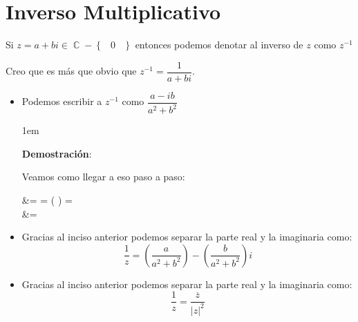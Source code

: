 \documentclass[12pt, fleqn]{report}                             %
\newenvironment{SmallIndentation}[1][0.75em]                    %
    {\begin{adjustwidth}{#1}{}\begin{footnotesize}}                 %
    {\end{footnotesize}\end{adjustwidth}}                           %
\DeclareMathOperator \Space {\quad}                             %
\DeclareMathOperator \MiniSpace {\;}                            %
\newcommand{\Set}[1]{\left\{ \MiniSpace #1 \MiniSpace \right\}} %
\newcommand{\Wrap}[1]{\left( #1 \right)}                        %
\newcommand{\pfrac}[2]{\Wrap{\dfrac{#1}{#2}}}                   %
\newenvironment{MultiLineEquation*}[1]                          %
        {\begin{equation*}\begin{alignedat}{#1}}                    %
        {\end{alignedat}\end{equation*}}                            %
\DeclareMathOperator \Complexs  {\mathbb{C}}                     %
\begin{document}
        \clearpage
        \section{Inverso Multiplicativo}
            
            Si $z = a + bi \in \Complexs - \Set{0}$ entonces podemos denotar al inverso de $z$ como
            $z^{-1}$

            Creo que es más que obvio que $z^{-1} = \dfrac{1}{a+bi}$.

            \begin{itemize}

                \item
                    Podemos escribir a $z^{-1}$ como $\dfrac{a-ib}{a^2+b^2}$
                    \begin{SmallIndentation}[1em]
                        \textbf{Demostración}:
                        
                        Veamos como llegar a eso paso a paso:
                        \begin{MultiLineEquation*}{1}
                             &=                          
                                          = \pfrac{a-bi}{a-bi}
                                          =               \\
                                         &=                  
                        \end{MultiLineEquation*}

                    \end{SmallIndentation}



                \item
                    Gracias al inciso anterior podemos separar la parte real y la imaginaria como:
                    \begin{equation}
                         \dfrac{1}{z} = \pfrac{a}{a^2+b^2} - \pfrac{b}{a^2+b^2}i 
                    \end{equation}


                \item
                    Gracias al inciso anterior podemos separar la parte real y la imaginaria como:
                    \begin{equation}
                        \dfrac{1}{z} = \dfrac{\overline{z}}{|z|^2}
                    \end{equation}


\end{itemize}
\end{document}
